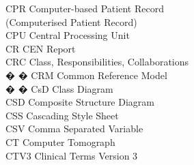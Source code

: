 \begin{tabbing}
    \>CPR \>\>Computer-based Patient Record\\
        \>\>\>(Computerised Patient Record)\\




    \>CPU \>\>Central Processing Unit\\

    \>CR \>\>CEN Report\\

    \>CRC \>\>Class, Responsibilities, Collaborations\\



� � \>CRM \>\>Common Reference Model\\


� � \>CsD \>\>Class Diagram\\

    \>CSD \>\>Composite Structure Diagram\\





    \>CSS \>\>Cascading Style Sheet\\

    \>CSV \>\>Comma Separated Variable\\

    \>CT \>\>Computer Tomograph\\

    \>CTV3 \>\>Clinical Terms Version 3\\


\end{tabbing}
